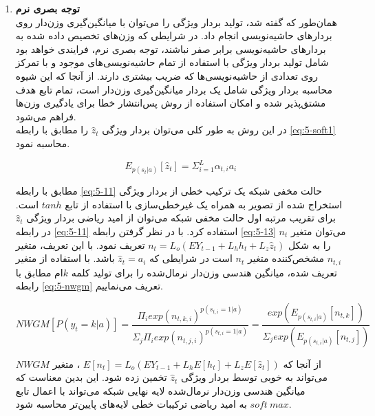 \begin{enumerate}
\item \textbf{توجه بصری نرم} \\

همان‌طور که گفته شد، تولید بردار ويژگی را می‌توان با میانگین‌گیری وزن‌دار روی بردارهای حاشیه‌نویسی انجام داد. در شرایطی که وزن‌های تخصیص داده شده به بردارهای حاشیه‌نویسی برابر صفر نباشند، توجه بصری نرم، فرایندی خواهد بود شامل تولید بردار ویژگی با استفاده از تمام حاشیه‌نویسی‌های موجود و با تمرکز روی تعدادی از حاشیه‌نویسی‌ها که ضریب بیشتری دارند. از آنجا که این شیوه محاسبه بردار ویژگی شامل یک بردار میانگین‌گیری وزن‌دار است، تمام تابع هدف مشتق‌پذیر شده و امکان استفاده از روش پس‌انتشار خطا برای یادگیری وزن‌ها فراهم می‌شود.
\\
در این روش به طور کلی می‌توان بردار ویژگی $\hat{z}_t$ را مطابق با رابطه \eqref{eq:5-soft1} محاسبه نمود.

\begin{equation}
E_{p(s_t | a)} [\hat{z}_t] = \Sigma_{i=1}^L \alpha_{t,i} a_i
\label{eq:5-soft1}
\end{equation}

مطابق با رابطه \eqref{eq:5-11} حالت مخفی شبکه یک ترکیب خطی از بردار ویژگی استخراج شده از تصویر به همراه یک غیرخطی‌سازی با استفاده از تابع $tanh$ است. برای تقریب مرتبه اول حالت مخفی شبکه می‌توان از امید ریاضی بردار ویژگی $\hat{z}_t$ در رابطه \eqref{eq:5-11} استفاده کرد. با در نظر گرفتن رابطه \eqref{eq:5-13} می‌توان متغیر $n_t$ را به شکل 
$n_t = L_o (EY_{t-1} + L_h h_t + L_z \hat{z}_t) $
تعریف نمود. با این تعریف،‌ متغیر $n_{t,i}$ مشخص‌کننده متغیر $n_t$ است در شرایطی که $\hat{z}_t = a_i$ باشد. با استفاده از متغیر تعریف شده، میانگین هندسی وزن‌دار نرمال‌شده  را برای تولید کلمه $k$ام مطابق با رابطه \eqref{eq:5-nwgm} تعریف می‌نماییم.

\begin{equation}
NWGM[P(y_t = k | a)] = \frac{\Pi_i exp(n_{t,k,i})^{p(s_{t,i} = 1 | a)}}{\Sigma_j \Pi_i exp(n_{t,j,i})^{p(s_{t,i} = 1 | a)}} = \frac{exp(E_{p(s_{t,i}|a)}[n_{t,k}])}{\Sigma_j exp(E_{p(s_{t,i}|a)}[n_{t,j}])}
\label{eq:5-nwgm}
\end{equation}

از آنجا که 
$E[n_t] = L_o(EY_{t-1} + L_h E[h_t] + L_z E[\hat{z}_t])$
، متغیر $NWGM$ می‌تواند به خوبی توسط بردار ویژگی $\hat{z}_t$ تخمین زده شود. این بدین معناست که میانگین هندسی وزن‌دار نرمال‌شده لایه نهایی شبکه می‌تواند با اعمال تابع $soft\>max$ به امید ریاضی ترکیبات خطی لایه‌های پایین‌تر محاسبه شود. 


\end{enumerate}


